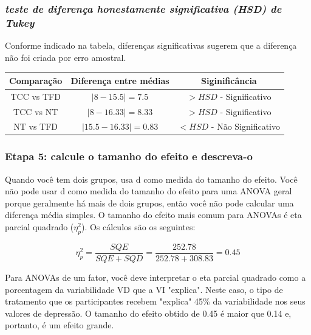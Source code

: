 \documentclass[11pt]{beamer}
\begin{document}
\begin{frame}
\frametitle{\textit{teste de diferença honestamente significativa (HSD) de Tukey}}

Conforme indicado na tabela, diferenças significativas sugerem que a diferença não foi criada por erro amostral.

\begin{table}[h]
\centering
\begin{tabular}{ccc}
\hline
Comparação & Diferença entre médias & Siginificância\\
\hline
TCC vs TFD & $|8-15.5|=7.5$ & $>HSD$ - Significativo\\
TCC vs NT & $|8-16.33|=8.33$ & $>HSD$ - Significativo\\
NT vs TFD & $|15.5-16.33|=0.83$ & $<HSD$ - Não Significativo\\
\hline
\end{tabular}
\end{table}

\end{frame}


\begin{frame}
\frametitle{Etapa 5: calcule o tamanho do efeito e descreva-o}
Quando você tem dois grupos, usa d como medida do tamanho do efeito. Você não pode usar d como medida do tamanho do efeito para uma ANOVA geral porque geralmente há mais de dois grupos, então você não pode calcular uma diferença média simples. O tamanho do efeito mais comum para ANOVAs é eta parcial quadrado  ($\eta_p^2$). Os cálculos são os seguintes:

\[\eta_p^2 = \frac{SQE}{SQE+SQD}=\frac{252.78}{252.78+308.83}=0.45\]

Para ANOVAs de um fator, você deve interpretar o eta parcial quadrado como a porcentagem da variabilidade VD que a VI "explica". Neste caso, o tipo de tratamento que os participantes recebem "explica" 45\% da variabilidade nos seus valores de depressão. O tamanho do efeito obtido de 0.45 é maior que 0.14 e, portanto, é um efeito grande.

\end{frame}
\end{document}
